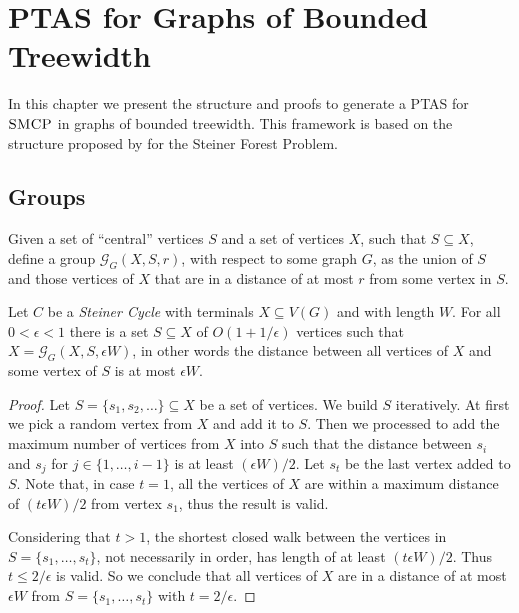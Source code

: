 \chapter{PTAS for Graphs of Bounded Treewidth}
\label{chapter:ptas_bounded_tree}

In this chapter we present the structure and proofs to generate a PTAS for \(\textsc{SMCP}\) in graphs of bounded treewidth. This framework is based on the structure proposed by \cite{Bateni} for the Steiner Forest Problem. 

\section{Groups}

Given a set of ``central'' vertices \(S\) and a set of vertices \(X\), such that \(S \subseteq X\), \citeauthor{Bateni} define a group \(\mathcal{G}_G(X, S, r)\), with respect to some graph \(G\), as the union of \(S\) and those vertices of \(X\) that are in a distance of at most \(r\) from some vertex in \(S\).

\begin{lemma} \label{groupLemma}
Let \(C\) be a \textit{Steiner Cycle} with terminals \(X \subseteq V(G)\) and with length \(W\). For all \(0 < \epsilon < 1\) there is a set \(S \subseteq X\) of \(O(1 + 1/\epsilon)\) vertices such that \(X = \mathcal{G}_G(X, S, \epsilon W)\), in other words the distance between all vertices of \(X\) and some vertex of \(S\) is at most \(\epsilon W\).
\end{lemma}
\begin{proof}

Let \(S = \{s_1, s_2, \dots\} \subseteq X\) be a set of vertices. We build \(S\) iteratively. At first we pick a random vertex from \(X\) and add it to \(S\). Then we processed to add the maximum number of vertices from \(X\) into \(S\) such that the distance between \(s_i\) and \(s_j\) for \(j \in \{1, \dots, i-1\}\) is at least \((\epsilon W)/2\). Let \(s_t\) be the last vertex added to \(S\). Note that, in case \(t = 1\), all the vertices of \(X\) are within a maximum distance of \((t \epsilon W)/2\) from vertex \(s_1\), thus the result is valid.


Considering that \(t > 1\), the shortest closed walk between the vertices in \(S = \{s_1, \dots, s_t\}\), not necessarily in order, has length of at least \((t \epsilon W)/2\). Thus \(t \leq 2/\epsilon\) is valid. So we conclude that all vertices of \(X\) are in a distance of at most \(\epsilon W\) from \(S = \{s_1, \dots, s_t\}\) with \(t = 2/\epsilon\).
\end{proof}

